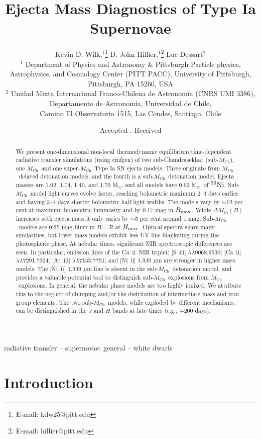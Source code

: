 \documentclass[useAMS,usenatbib,useasmath]{mnras}
\title[SNe Ia Ejecta Mass Diagnostics]
{Ejecta Mass Diagnostics of Type Ia Supernovae}
\author[Kevin D. Wilk, D. John Hillier, Luc Dessart]
{Kevin D. Wilk,$^{1}$\thanks{E-mail: kdw25@pitt.edu} D. John Hillier,$^1$\thanks{E-mail: hillier@pitt.edu}  Luc Dessart$^2$ \\
$^1$ Department of Physics and Astronomy \& Pittsburgh Particle physics, Astrophysics, and Cosmology Center (PITT PACC), University of Pittsburgh,  \\ Pittsburgh, PA 15260, USA \\
$^2$ Unidad Mixta Internacional Franco-Chilena de Astronom\'ia (CNRS UMI 3386), 
Departamento de Astronom\'ia, Universidad de Chile, \\
Camino El Observatorio 1515, Las Condes, Santiago, Chile}
\newcommand{\Mch}{\hbox{$M_{\text{Ch}}$}}
\newcommand{\Msun}{\hbox{M$_\odot$}}
\newcommand{\elem}[2][default]{$^{#1}{\rm #2}$}
\newcommand{\caii}{\mbox{Ca~{\sc ii}}}
\newcommand{\ariii}{\mbox{Ar~{\sc iii}}}
\newcommand{\nkii}{\mbox{Ni~{\sc ii}}}
\newcommand{\siii}{\mbox{S~{\sc iii}}}
\newcommand{\lb}{$\lambda$}
\newcommand{\cmfgen}{\sc cmfgen}
\begin{document}
\date{Accepted . Received }

\pagerange{\pageref{firstpage}--\pageref{lastpage}} 

\maketitle

\label{firstpage}

\begin{abstract}
We present one-dimensional non-local thermodynamic equilibrium time-dependent radiative transfer simulations (using {\cmfgen}) of two sub-Chandrasekhar (sub-\Mch), one \Mch\ and one super-\Mch\ Type Ia SN ejecta models. Three originate from \Mch\ delayed detonation models, and the fourth is a sub-\Mch\ detonation model.  Ejecta masses are 1.02, 1.04, 1.40, and 1.70 \Msun, and all models have 0.62 \Msun\ of \elem[56]{Ni}. Sub-\Mch\ model light curves evolve faster, reaching bolometric maximum 2--3 days earlier and having 3--4 days shorter bolometric half light widths. The models vary by $\sim$12 per cent at maximum bolometric luminosity and by 0.17 mag in $B_{\rm max}$. While $\Delta M_{15}(B)$ increases with ejecta mass it only varies by $\sim$5 per cent around 1 mag. Sub-\Mch\ models are 0.25 mag bluer in $B-R$ at $B_{\rm max}$. Optical spectra share many similarities, but lower mass models exhibit less UV line blanketing during the photospheric phase. At nebular times, significant NIR spectroscopic differences are seen. In particular, emission lines of the \caii\ NIR triplet; [\siii] \lb\lb9068,9530; [\caii] \lb\lb7291,7324; [\ariii] \lb\lb7135,7751; and [\nkii] 1.939 $\mu$m are stronger in higher mass models. The [\nkii] 1.939 $\mu$m line is absent in the sub-\Mch\ detonation model, and provides a valuable potential tool to distinguish sub-\Mch\ explosions from \Mch\ explosions. In general, the nebular phase models are too highly ionized. We attribute this to the neglect of clumping and/or the distribution of intermediate mass and iron group elements. The two sub-\Mch\ models, while exploded by different mechanisms, can be distinguished in the $J$ and $H$ bands at late times (e.g., $+200$ days).
\end{abstract}
\begin{keywords}
radiative transfer -- supernovae: general -- white dwarfs
\end{keywords}

\section{Introduction}
\end{document}
